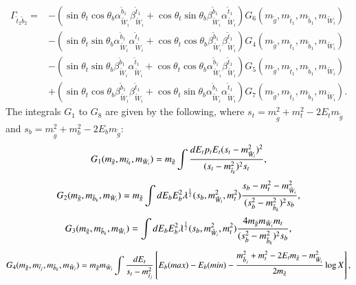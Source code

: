 \documentclass[final,3p,times,pdflatex]{elsarticle}
\begin{document}
\begin{equation}
\begin{aligned}
\Gamma_{\tilde{t}_2 \tilde{b}_2} = & -(\sin\theta_t \cos\theta_b \alpha_{\tilde{W}_i}^{\tilde{b}_1} \beta_{\tilde{W}_i}^{\tilde{t}_1} + \cos\theta_t \sin\theta_b \beta_{\tilde{W}_i}^{\tilde{b}_1} \alpha_{\tilde{W}_i}^{\tilde{t}_1})G_{6}(m_{\tilde{g}},m_{\tilde{t}_1},m_{\tilde{b}_1},m_{\tilde{W}_i}) \\ & - (\sin\theta_t \sin\theta_b \alpha_{\tilde{W}_i}^{\tilde{b}_1}\alpha_{\tilde{W}_i}^{\tilde{t}_1} + \cos\theta_t \cos\theta_b \beta_{\tilde{W}_i}^{\tilde{b}_1}\beta_{\tilde{W}_i}^{\tilde{t}_1}) G_{4}(m_{\tilde{g}},m_{\tilde{t}_1}, m_{\tilde{b}_1},m_{\tilde{W}_i}) \\ & - (\sin\theta_t \sin\theta_b \beta_{\tilde{W}_i}^{\tilde{b}_1} \alpha_{\tilde{W}_i}^{\tilde{t}_1} + \cos\theta_t \cos\theta_b \alpha_{\tilde{W}_i}^{\tilde{b}_1} \beta_{\tilde{W}_i}^{\tilde{t}_1})G_{5}(m_{\tilde{g}},m_{\tilde{t}_1}, m_{\tilde{b}_1}, m_{\tilde{W}_i}) \\ & + (\sin\theta_t\cos\theta_b \beta_{\tilde{W}_i}^{\tilde{b}_1} \beta_{\tilde{W}_i}^{\tilde{t}_1} + \cos\theta_t \sin\theta_b \alpha_{\tilde{W}_i}^{\tilde{b}_1} \alpha_{\tilde{W}_i}^{\tilde{t}_1})G_{7}(m_{\tilde{g}},m_{\tilde{t}_1},m_{\tilde{b}_1},m_{\tilde{W}_i}).
\end{aligned}
\end{equation}
The integrals $G_1$ to $G_8$ are given by the following, where $s_{t} = m_{\tilde{g}}^2 + m_{t}^2 -2 E_{t} m_{\tilde{g}}$ and $s_{b} = m_{\tilde{g}}^2 + m_{b}^2 -2 E_{b} m_{\tilde{g}}$:
\begin{equation}
G_{1}(m_{\tilde{g}},m_{\tilde{t}_k},m_{\tilde{W}_i}) = m_{\tilde{g}} \int {d E_{t} p_{t} E_{t} (s_{t} - m_{\tilde{W}_i}^2)^2 \over (s_{t} - m_{\tilde{t}_k}^2)^2 s_{t}},
\end{equation}
\begin{equation}
G_{2}(m_{\tilde{g}},m_{\tilde{b}_k},m_{\tilde{W}_i}) = m_{\tilde{g}} \int d E_{b} E_{b}^2 \lambda^{1 \over 2} (s_{b},m_{\tilde{W}_i}^2,m_{t}^2) {s_{b} - m_{t}^2 - m_{\tilde{W}_i}^2 \over (s_{b}^2 - m_{\tilde{b}_k}^2)^2 s_b},
\end{equation}
\begin{equation}
G_{3}(m_{\tilde{g}},m_{\tilde{b}_k},m_{\tilde{W}_i}) = \int d E_{b} E_{b}^2 \lambda^{1 \over 2} (s_{b},m_{\tilde{W}_i}^2,m_{t}^2) {4 m_{\tilde{g}} m_{\tilde{W}_i} m_{t} \over (s_{b}^2 - m_{\tilde{b}_k}^2)^2 s_b},
\end{equation}
\begin{equation}
G_{4}(m_{\tilde{g}},m_{\tilde{t}_j},m_{\tilde{b}_k},m_{\tilde{W}_i}) = m_{\tilde{g}} m_{\tilde{W}_i} \int {d E_{t} \over s_{t} - m_{\tilde{t}_j}^2} \left[ E_{b}(max) - E_{b}(min) - {m_{\tilde{b}_j}^2 + m_{t}^2 - 2 E_{t} m_{\tilde{g}} - m_{\tilde{W}_i}^2 \over 2 m_{\tilde{g}}} \log X\right] ,
\end{equation}
\end{document}
